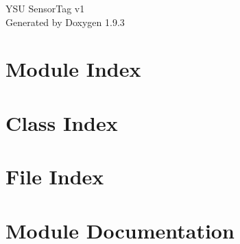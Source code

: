 \documentclass[twoside]{book}
\newcommand{\+}{\discretionary{\mbox{\scriptsize$\hookleftarrow$}}{}{}}
\newcommand{\clearemptydoublepage}{%
    \newpage{\pagestyle{empty}\cleardoublepage}%
  }
\begin{document}
  \raggedbottom
    \hypersetup{pageanchor=false,
                bookmarksnumbered=true,
                pdfencoding=unicode
               }
  \begin{titlepage}
  \vspace*{7cm}
  \begin{center}%
  {\Large YSU Sensor\+Tag v1}\\
  \vspace*{1cm}
  {\large Generated by Doxygen 1.9.3}\\
  \end{center}
  \end{titlepage}
  \clearemptydoublepage
  \tableofcontents
  \clearemptydoublepage
  \hypersetup{pageanchor=true}
\chapter{Module Index}

\chapter{Class Index}

\chapter{File Index}

\chapter{Module Documentation}












\end{document}
